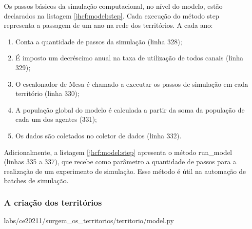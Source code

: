 Os passos básicos da simulação computacional, no nível do modelo, estão declarados na listagem \ref{jhcf:model:step}.
Cada execução do método step representa a passagem de um ano na rede dos territórios.
A cada ano:
\begin{enumerate}
    \item Conta a quantidade de passos da simulação (linha 328);
    \item É imposto um decréscimo anual na taxa de utilização de todos canais (linha 329);
    \item O escalonador de Mesa é chamado a executar os passos de simulação em cada território (linha 330);
    \item A população global do modelo é calculada a partir da soma da população de cada um dos agentes (331);
    \item Os dados são coletados no coletor de dados (linha 332).
\end{enumerate}

Adicionalmente, a listagem \ref{jhcf:model:step} apresenta o método run\_model (linhas 335 a 337), que recebe como parâmetro a quantidade de passos para a realização de um experimento de simulação.
Esse método é útil na automação de batches de simulação.

\subsubsection{A criação dos territórios}


{labs/ce20211/surgem_os_territorios/territorio/model.py}

